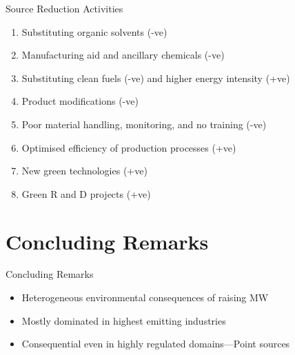 \documentclass[aspectratio = 169]{beamer}
\begin{document}
    \begin{frame}{Source Reduction Activities}
        \begin{enumerate}
            \item Substituting organic solvents (-ve)
            \item Manufacturing aid and ancillary chemicals (-ve)
            \item Substituting clean fuels (-ve) and higher energy intensity (+ve)
            \item Product modifications (-ve)
            \item Poor material handling, monitoring, and no training (-ve)
            \item Optimised efficiency of production processes (+ve)
            \item New green technologies (+ve)
            \item Green R and D projects (+ve)
        \end{enumerate}
        \hypertarget{Mechanism Source Reduction}{}
        \hyperlink{tab:mechanism-source-reduction}{}
        \hypertarget{Mechanism Material Products}{}
        \hyperlink{tab:mechanism-material-products-submod}{}
        \hypertarget{Mechanism Process}{}
        \hyperlink{tab:mechanism-process}{}
        \hypertarget{Mechanism Inventory Operations}{}
        \hyperlink{tab:mechanism-inventory-operations}{}
    \end{frame}


    \section{Concluding Remarks}\label{sec:concluding-remarks}
    \begin{frame}{Concluding Remarks}
        \begin{itemize}
            \item Heterogeneous environmental consequences of raising MW
            \item Mostly dominated in highest emitting industries
            \item Consequential even in highly regulated domains---Point sources
        \end{itemize}
    \end{frame}
\end{document}
